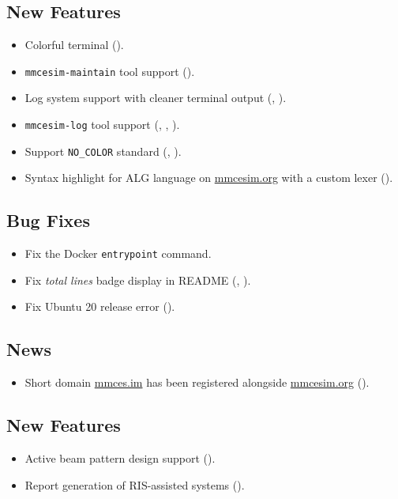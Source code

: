 \subsection*{New Features}
\begin{itemize}
  \item Colorful terminal ().
  \item \texttt{mmcesim-maintain} tool support ().
  \item Log system support with cleaner terminal output (, ).
  \item \texttt{mmcesim-log} tool support (, , ).
  \item Support \texttt{NO\_COLOR} standard (, ).
  \item Syntax highlight for ALG language on \href{https://mmcesim.org}{mmcesim.org} with a custom lexer ().
\end{itemize}
\subsection*{Bug Fixes}
\begin{itemize}
  \item Fix the Docker \texttt{entrypoint} command.
  \item Fix \textit{total lines} badge display in README (, ).
  \item Fix Ubuntu 20 release error ().
\end{itemize}
\subsection*{News}
\begin{itemize}
  \item Short domain \href{https://mmces.im}{mmces.im} has been registered alongside \href{https://mmcesim.org}{mmcesim.org} ().
\end{itemize}

\subsection*{New Features}
\begin{itemize}
  \item Active beam pattern design support ().
  \item Report generation of RIS-assisted systems ().
\end{itemize}
